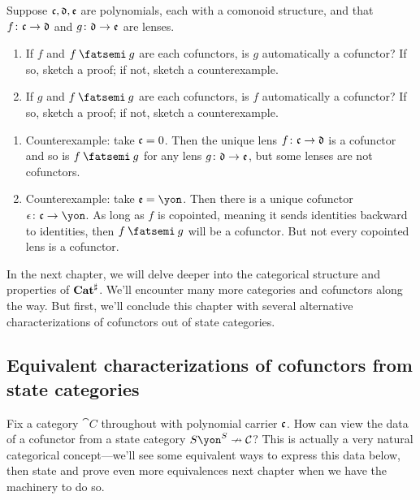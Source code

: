 \documentclass[Book-Poly]{subfiles}
\begin{document}
\begin{exercise}
Suppose $\mathfrak{c},\mathfrak{d},\mathfrak{e}$ are polynomials, each with a comonoid structure, and that $f\colon\mathfrak{c}\to\mathfrak{d}$ and $g\colon\mathfrak{d}\to\mathfrak{e}$ are lenses.
\begin{enumerate}
	\item If $f$ and $f\then g$ are each cofunctors, is $g$ automatically a cofunctor?
	If so, sketch a proof; if not, sketch a counterexample.
	\item If $g$ and $f\then g$ are each cofunctors, is $f$ automatically a cofunctor?
	If so, sketch a proof; if not, sketch a counterexample.
\qedhere
\end{enumerate}
\begin{solution}
\begin{enumerate}
    \item Counterexample: take $\mathfrak{c}=0$. Then the unique lens $f\colon\mathfrak{c}\to\mathfrak{d}$ is a cofunctor and so is $f\then g$ for any lens $g\colon\mathfrak{d}\to\mathfrak{e}$, but some lenses are not cofunctors.
    \item Counterexample: take $\car{e}=\yon$. Then there is a unique cofunctor $\epsilon\colon\car{c}\to\yon$. As long as $f$ is copointed, meaning it sends identities backward to identities, then $f\then g$ will be a cofunctor. But not every copointed lens is a cofunctor.
\end{enumerate}
\end{solution}
\end{exercise}

In the next chapter, we will delve deeper into the categorical structure and properties of $\mathbf{Cat}^\sharp$.
We'll encounter many more categories and cofunctors along the way.
But first, we'll conclude this chapter with several alternative characterizations of cofunctors out of state categories.

\subsection{Equivalent characterizations of cofunctors from state categories} \label{sec.comon.sharp.cof.from_state}

Fix a category $\cat{C}$ throughout with polynomial carrier $\mathfrak{c}$.
How can view the data of a cofunctor from a state category $S\yon^S\cof\cat{C}$?
This is actually a very natural categorical concept---we'll see some equivalent ways to express this data below, then state and prove even more equivalences next chapter when we have the machinery to do so.
\end{document}
